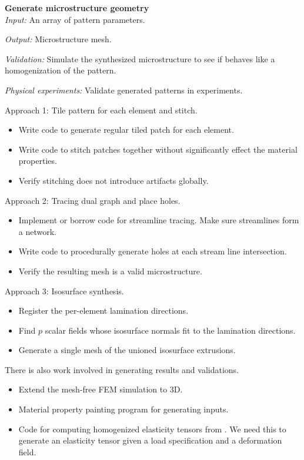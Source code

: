 \begin{description}
\item{\bf Generate microstructure geometry}\\
{\it Input:} An array of pattern parameters.

{\it Output:} Microstructure mesh.

{\it Validation:} Simulate the synthesized microstructure to see if behaves like
a homogenization of the pattern.

{\it Physical experiments:} Validate generated patterns in experiments.

Approach 1: Tile pattern for each element and stitch.
\begin{itemize}
\item Write code to generate regular tiled patch for each element.
\item Write code to stitch patches together without significantly effect the material
properties.
\item Verify stitching does not introduce artifacts globally.
\end{itemize}

Approach 2: Tracing dual graph and place holes.
\begin{itemize}
\item Implement or borrow code for streamline tracing.  Make sure streamlines
form a network.
\item Write code to procedurally generate holes at each stream line
intersection.
\item Verify the resulting mesh is a valid microstructure.
\end{itemize}

Approach 3: Isosurface synthesis.
\begin{itemize}
    \item Register the per-element lamination directions.
    \item Find $p$ scalar fields whose isosurface normals fit to the lamination
        directions.
    \item Generate a single mesh of the unioned isosurface extrusions.
\end{itemize}
\end{description}

There is also work involved in generating results and validations.
\begin{itemize}
\item Extend the mesh-free FEM simulation to 3D.
\item Material property painting program for generating inputs.
\item Code for computing homogenized elasticity tensors from
    \cite{Kharevych2009}. We need this to generate an elasticity tensor given a
    load specification and a deformation field.
\end{itemize}



